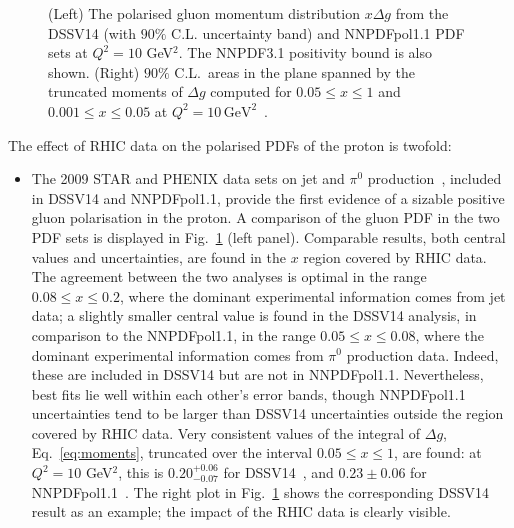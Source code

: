\begin{figure}[!t]
\caption{\small (Left) The polarised gluon momentum distribution  
$x\Delta g$ from the DSSV14 (with $90\%$ C.L. uncertainty band)
and NNPDFpol1.1 PDF sets at $Q^2=10$ GeV$^2$. The NNPDF3.1 positivity
bound is also shown.
(Right) $90\%$ C.L.\ areas in the plane spanned by the truncated moments of
$\Delta g$ computed for $0.05\leq x\leq 1$ and $0.001\leq x\leq 0.05$ at $Q^2=10\,\mathrm{GeV}^2$~\cite{deFlorian:2014yva}.}
\label{fig:RHICpdfs}
\end{figure}

The effect of RHIC data on the polarised PDFs of the proton is twofold:
\begin{itemize}

\item The 2009 STAR and PHENIX data sets on jet and $\pi^0$ 
production~\cite{Adamczyk:2014ozi,Adare:2014hsq}, included in DSSV14
and NNPDFpol1.1, provide the first evidence
of a sizable positive gluon polarisation in the proton. 
%
A comparison of the gluon PDF in the two PDF sets is displayed in 
Fig.~\ref{fig:RHICpdfs} (left panel). 
%
Comparable results, both central values and uncertainties, are found in the 
$x$ region covered by RHIC data. 
%
The agreement between the two analyses is optimal in the
range $0.08\leq x \leq 0.2$, where the dominant experimental information comes
from jet data; a slightly smaller central value is found in the DSSV14 
analysis, in comparison to the NNPDFpol1.1, in the range 
$0.05\leq x \leq 0.08$, where the dominant experimental information comes from 
$\pi^0$ production data. 
%
Indeed, these are included in DSSV14 but are not
in NNPDFpol1.1. 
%
Nevertheless, best fits lie well within each other's error
bands, though NNPDFpol1.1 uncertainties tend to be larger than DSSV14
uncertainties outside the region covered by RHIC data.
%
Very consistent values of the integral of $\Delta g$, 
Eq.~\eqref{eq:moments}, truncated over the interval $0.05\leq x \leq 1$, are 
found: at $Q^2=10$ GeV$^2$, this is $0.20^{+0.06}_{-0.07}$ for 
DSSV14~\cite{deFlorian:2014yva}, and $0.23\pm 0.06$ for 
NNPDFpol1.1~\cite{Nocera:2014gqa}. The right plot in Fig.~\ref{fig:RHICpdfs} 
shows the corresponding DSSV14 result as an example; the impact of the RHIC
data is clearly visible. 


\end{itemize}

